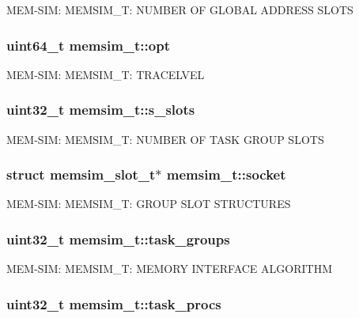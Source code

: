 M\-E\-M-\/\-S\-I\-M\-: M\-E\-M\-S\-I\-M\-\_\-\-T\-: N\-U\-M\-B\-E\-R O\-F G\-L\-O\-B\-A\-L A\-D\-D\-R\-E\-S\-S S\-L\-O\-T\-S \hypertarget{structmemsim__t_a34e92877e65240907a70bbfe16fd4a34}{
\subsubsection[{opt}]{\setlength{\rightskip}{0pt plus 5cm}uint64\-\_\-t memsim\-\_\-t\-::opt}}\label{structmemsim__t_a34e92877e65240907a70bbfe16fd4a34}
M\-E\-M-\/\-S\-I\-M\-: M\-E\-M\-S\-I\-M\-\_\-\-T\-: T\-R\-A\-C\-E\-L\-V\-E\-L \hypertarget{structmemsim__t_a35adeb1c88dde11bfe128119c723c037}{
\subsubsection[{s\-\_\-slots}]{\setlength{\rightskip}{0pt plus 5cm}uint32\-\_\-t memsim\-\_\-t\-::s\-\_\-slots}}\label{structmemsim__t_a35adeb1c88dde11bfe128119c723c037}
M\-E\-M-\/\-S\-I\-M\-: M\-E\-M\-S\-I\-M\-\_\-\-T\-: N\-U\-M\-B\-E\-R O\-F T\-A\-S\-K G\-R\-O\-U\-P S\-L\-O\-T\-S \hypertarget{structmemsim__t_a42ae6dd8a64e2d04c30e35354ec25555}{
\subsubsection[{socket}]{\setlength{\rightskip}{0pt plus 5cm}struct {\bf memsim\-\_\-slot\-\_\-t}$\ast$ memsim\-\_\-t\-::socket}}\label{structmemsim__t_a42ae6dd8a64e2d04c30e35354ec25555}
M\-E\-M-\/\-S\-I\-M\-: M\-E\-M\-S\-I\-M\-\_\-\-T\-: G\-R\-O\-U\-P S\-L\-O\-T S\-T\-R\-U\-C\-T\-U\-R\-E\-S \hypertarget{structmemsim__t_ac893c94cb9e4cb525baa4a4352ef6269}{
\subsubsection[{task\-\_\-groups}]{\setlength{\rightskip}{0pt plus 5cm}uint32\-\_\-t memsim\-\_\-t\-::task\-\_\-groups}}\label{structmemsim__t_ac893c94cb9e4cb525baa4a4352ef6269}
M\-E\-M-\/\-S\-I\-M\-: M\-E\-M\-S\-I\-M\-\_\-\-T\-: M\-E\-M\-O\-R\-Y I\-N\-T\-E\-R\-F\-A\-C\-E A\-L\-G\-O\-R\-I\-T\-H\-M \hypertarget{structmemsim__t_a13c682d9789b022f02fbeafcdc2a0866}{
\subsubsection[{task\-\_\-procs}]{\setlength{\rightskip}{0pt plus 5cm}uint32\-\_\-t memsim\-\_\-t\-::task\-\_\-procs}}\label{structmemsim__t_a13c682d9789b022f02fbeafcdc2a0866}
